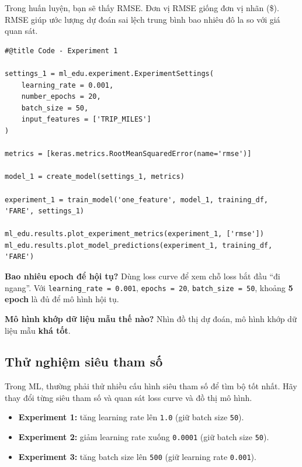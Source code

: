 \documentclass[12pt,a4paper]{article}
\begin{document}
\begin{luuy}[title={RMSE có đơn vị giống nhãn}]
Trong huấn luyện, bạn sẽ thấy RMSE. Đơn vị RMSE giống đơn vị nhãn (\$).
RMSE giúp ước lượng dự đoán sai lệch trung bình bao nhiêu đô la so với giá quan sát.
\end{luuy}

\begin{lstlisting}
#@title Code - Experiment 1

settings_1 = ml_edu.experiment.ExperimentSettings(
    learning_rate = 0.001,
    number_epochs = 20,
    batch_size = 50,
    input_features = ['TRIP_MILES']
)

metrics = [keras.metrics.RootMeanSquaredError(name='rmse')]

model_1 = create_model(settings_1, metrics)

experiment_1 = train_model('one_feature', model_1, training_df, 'FARE', settings_1)

ml_edu.results.plot_experiment_metrics(experiment_1, ['rmse'])
ml_edu.results.plot_model_predictions(experiment_1, training_df, 'FARE')
\end{lstlisting}

\begin{vidu}[title={Đáp án tham khảo}]
\textbf{Bao nhiêu epoch để hội tụ?}
Dùng loss curve để xem chỗ loss bắt đầu ``đi ngang''.
Với \texttt{learning\_rate = 0.001}, \texttt{epochs = 20}, \texttt{batch\_size = 50}, khoảng \textbf{5 epoch} là đủ để mô hình hội tụ.

\medskip
\textbf{Mô hình khớp dữ liệu mẫu thế nào?}
Nhìn đồ thị dự đoán, mô hình khớp dữ liệu mẫu \textbf{khá tốt}.
\end{vidu}

\subsection{Thử nghiệm siêu tham số}

\begin{dongco}[title={Vì sao phải chạy nhiều experiment?}]
Trong ML, thường phải thử nhiều cấu hình siêu tham số để tìm bộ tốt nhất.
Hãy thay đổi từng siêu tham số và quan sát loss curve và đồ thị mô hình.
\end{dongco}

\begin{phuongphap}[title={Các thử nghiệm gợi ý}]
\begin{itemize}
  \item \textbf{Experiment 1:} tăng learning rate lên \texttt{1.0} (giữ batch size \texttt{50}).
  \item \textbf{Experiment 2:} giảm learning rate xuống \texttt{0.0001} (giữ batch size \texttt{50}).
  \item \textbf{Experiment 3:} tăng batch size lên \texttt{500} (giữ learning rate \texttt{0.001}).
\end{itemize}
\end{phuongphap}
\end{document}

